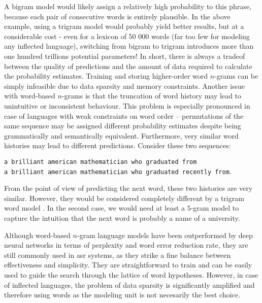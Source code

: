 	A bigram model would likely assign a relatively high probability to this phrase, because each pair of consecutive words is entirely plausible. 
	In the above example, using a trigram model would probably yield better results, but at a considerable cost - even for a lexicon of 50 000 words (far too few for modeling any inflected language), switching from bigram to trigram introduces more than one hundred trillions potential parameters! In short, there is always a tradeof between the quality of predictions and the amount of data required to calculate the probability estimates. Training and storing higher-order word $n$-grams can be simply infeasible due to data sparsity and memory constraints.
	Another issue with word-based $n$-grams is that the truncation of word history may lead to unintuitive or inconsistent behaviour. This problem is especially pronounced in case of languages with weak constraints on word order -- permutations of the same sequence may be assigned different probability estimates despite being grammatically and semantically equivalent. Furthermore, very similar word histories may lead to different predictions. Consider these two sequences:
	\begin{center}
		\texttt{a brilliant american mathematician who graduated from} \\
		\texttt{a brilliant american mathematician who graduated recently from}.
	\end{center}
	From the point of view of predicting the next word, these two histories are very similar. However, they would be considered completely different by a trigram word model \cite{whittaker2000statistical}. In the second case, we would need at least a $5$-gram model to capture the intuition that the next word is probably a name of a university.

	Although word-based $n$-gram language models have been outperformed by deep neural networks in terms of perplexity and word error reduction rate, they are still commonly used in \gls{asr} systems, as they strike a fine balance between effectiveness and simplicity. They are straightforward to train and can be easily used to guide the search through the lattice of word hypotheses. However, in case of inflected languages, the problem of data sparsity is significantly amplified and therefore using words as the modeling unit is not necesarily the best choice.
